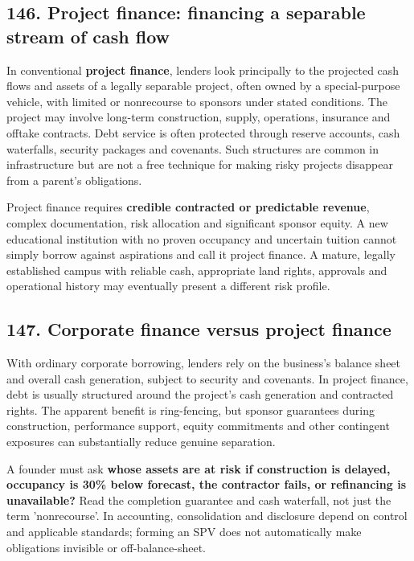 \subsection{146. Project finance: financing a separable stream of cash flow}


In conventional \textbf{project finance}, lenders look principally to the projected cash flows and assets of a legally separable project, often owned by a special-purpose vehicle, with limited or nonrecourse to sponsors under stated conditions. The project may involve long-term construction, supply, operations, insurance and offtake contracts. Debt service is often protected through reserve accounts, cash waterfalls, security packages and covenants. Such structures are common in infrastructure but are not a free technique for making risky projects disappear from a parent's obligations.

Project finance requires \textbf{credible contracted or predictable revenue}, complex documentation, risk allocation and significant sponsor equity. A new educational institution with no proven occupancy and uncertain tuition cannot simply borrow against aspirations and call it project finance. A mature, legally established campus with reliable cash, appropriate land rights, approvals and operational history may eventually present a different risk profile.

\subsection{147. Corporate finance versus project finance}


With ordinary corporate borrowing, lenders rely on the business's balance sheet and overall cash generation, subject to security and covenants. In project finance, debt is usually structured around the project's cash generation and contracted rights. The apparent benefit is ring-fencing, but sponsor guarantees during construction, performance support, equity commitments and other contingent exposures can substantially reduce genuine separation.

A founder must ask \textbf{whose assets are at risk if construction is delayed, occupancy is 30\% below forecast, the contractor fails, or refinancing is unavailable?} Read the completion guarantee and cash waterfall, not just the term 'nonrecourse'. In accounting, consolidation and disclosure depend on control and applicable standards; forming an SPV does not automatically make obligations invisible or off-balance-sheet.

